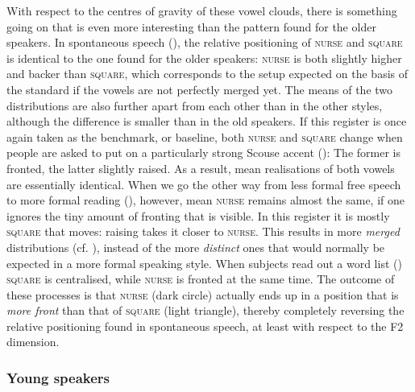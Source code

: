 With respect to the centres of gravity of these vowel clouds, there is something going on that is even more interesting than the pattern found for the older speakers.
In spontaneous speech (), the relative positioning of \textsc{nurse} and \textsc{square} is identical to the one found for the older speakers: \textsc{nurse} is both slightly higher and backer than \textsc{square}, which corresponds to the setup expected on the basis of the standard if the vowels are not perfectly merged yet.
The means of the two distributions are also further apart from each other than in the other styles, although the difference is smaller than in the old speakers.
If this register is once again taken as the benchmark, or baseline, both \textsc{nurse} and \textsc{square} change when people are asked to put on a particularly strong Scouse accent (): The former is fronted, the latter slightly raised.
As a result, mean realisations of both vowels are essentially identical.
When we go the other way from less formal free speech to more formal reading (), however, mean \textsc{nurse} remains almost the same, if one ignores the tiny amount of fronting that is visible.
In this register it is mostly \textsc{square} that moves: raising takes it closer to \textsc{nurse}.
This results in more \emph{merged} distributions (cf. ), instead of the more \emph{distinct} ones that would normally be expected in a more formal speaking style.
When subjects read out a word list () \textsc{square} is centralised, while \textsc{nurse} is fronted at the same time.
The outcome of these processes is that \textsc{nurse} (dark circle) actually ends up in a position that is \emph{more front} than that of \textsc{square} (light triangle), thereby completely reversing the relative positioning found in spontaneous speech, at least with respect to the F2 dimension.

\subsubsection{Young speakers}


